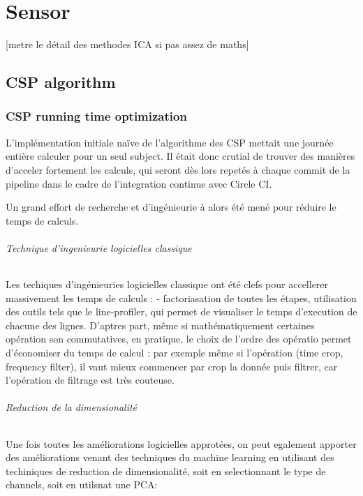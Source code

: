 
\chapter{Sensor}

[metre le détail des methodes ICA si pas assez de maths]

\section{CSP algorithm}

\subsection{CSP running time optimization}

L'implémentation initiale naïve de l'algorithme des CSP mettait une journée entière calculer pour un seul subject. Il était donc crutial de trouver des manières d'acceler fortement les calculs, qui seront dès lors repetés à chaque commit de la pipeline dans le cadre de l'integration continue avec Circle CI.

Un grand effort de recherche et d'ingénieurie à alors été mené pour réduire le temps de calculs.

\subparagraph{Technique d'ingenieurie logicielles classique}

Les techiques d'ingénieuries logicielles classique ont été clefs pour accellerer massivement les temps de calculs : - factoriasation de toutes les étapes, utilisation des outils tels que le line-profiler, qui permet de visualiser le temps d'execution de chacune des lignes. D'aptres part, même si mathématiquement certaines opération son commutatives, en pratique, le choix de l'ordre des opératio permet d'économiser du temps de calcul : par exemple même si l'opération (time crop, frequency filter), il vaut mieux commencer par crop la donnée puis filtrer, car l'opération de filtrage est très couteuse.


\subparagraph{Reduction de la dimensionalité}

Une fois toutes les améliorations logicielles approtées, on peut egalement apporter des améliorations venant des techniques du machine learning en utilisant des techiniques de reduction de dimensionalité, soit en selectionnant le type de channels, soit en utilsnat une PCA:

